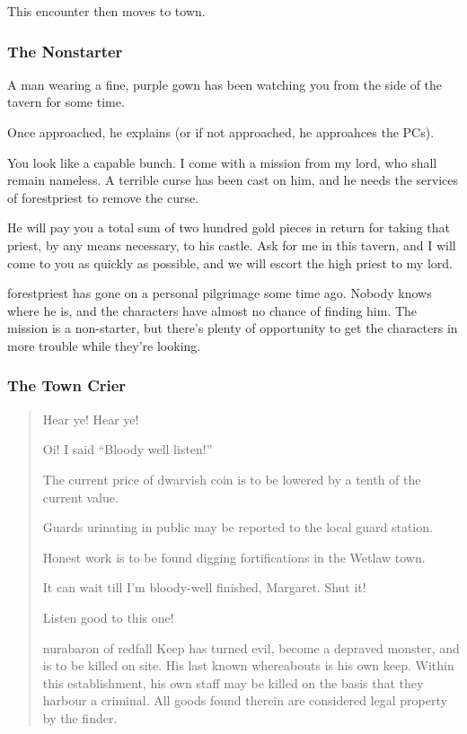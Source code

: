 This encounter then moves to town.

\subsubsection{The Nonstarter}

\begin{boxtext}
	A man wearing a fine, purple gown has been watching you from the side of the tavern for some time.
\end{boxtext}

Once approached, he explains (or if not approached, he approahces the PCs).

\begin{speechtext}
	You look like a capable bunch.  I come with a mission from my lord, who shall remain nameless.  A terrible curse has been cast on him, and he needs the services of \gls{forestpriest} to remove the curse.

	He will pay you a total sum of two hundred gold pieces in return for taking that priest, by any means necessary, to his castle.  Ask for me in this tavern, and I will come to you as quickly as possible, and we will escort the high priest to my lord.
\end{speechtext}

\gls{forestpriest} has gone on a personal pilgrimage some time ago.  Nobody knows where he is, and the characters have almost no chance of finding him.  The mission is a non-starter, but there's plenty of opportunity to get the characters in more trouble while they're looking.

\humandiplomat

\subsubsection{The Town Crier}
\begin{boxtext}
	\begin{verse}
		Hear ye! Hear ye!

		Oi! I said ``Bloody well listen!''

		The current price of dwarvish coin is to be lowered by a tenth of the current value.

		Guards urinating in public may be reported to the local guard station.

		Honest work is to be found digging fortifications in the Wetlaw town.

		It can wait till I'm bloody-well finished, Margaret.  Shut it!

		Listen good to this one!

		\gls{nurabaron} of \gls{redfall} Keep has turned evil, become a depraved monster, and is to be killed on site.  His last known whereabouts is his own keep.  Within this establishment, his own staff may be killed on the basis that they harbour a criminal.  All goods found therein are considered legal property by the finder.


	\end{verse}
\end{boxtext}

